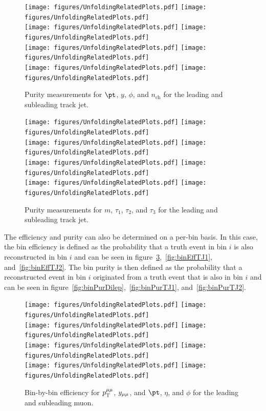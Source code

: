 \begin{figure}[h!]
  \centering
  \texttt{[image: figures/UnfoldingRelatedPlots.pdf]}
  \texttt{[image: figures/UnfoldingRelatedPlots.pdf]} \\
  \texttt{[image: figures/UnfoldingRelatedPlots.pdf]}
  \texttt{[image: figures/UnfoldingRelatedPlots.pdf]} \\
  \texttt{[image: figures/UnfoldingRelatedPlots.pdf]}
  \texttt{[image: figures/UnfoldingRelatedPlots.pdf]} \\
  \texttt{[image: figures/UnfoldingRelatedPlots.pdf]}
  \texttt{[image: figures/UnfoldingRelatedPlots.pdf]}
  \caption{Purity measurements for $\pt$, $y$, $\phi$, and $n_{\text{ch}}$ for the leading and subleading track jet.}
  \label{fig:PurTJ1}
\end{figure}

\begin{figure}[h!]
  \centering
  \texttt{[image: figures/UnfoldingRelatedPlots.pdf]}
  \texttt{[image: figures/UnfoldingRelatedPlots.pdf]} \\
  \texttt{[image: figures/UnfoldingRelatedPlots.pdf]}
  \texttt{[image: figures/UnfoldingRelatedPlots.pdf]} \\
  \texttt{[image: figures/UnfoldingRelatedPlots.pdf]}
  \texttt{[image: figures/UnfoldingRelatedPlots.pdf]} \\
  \texttt{[image: figures/UnfoldingRelatedPlots.pdf]}
  \texttt{[image: figures/UnfoldingRelatedPlots.pdf]}
  \caption{Purity measurements for $m$, $\tau_1$, $\tau_2$, and $\tau_3$ for the leading and subleading track jet.}
  \label{fig:PurTJ2}
\end{figure}

The efficiency and purity can also be determined on a per-bin basis. In this case, the bin efficiency is defined as the probability that a truth event in bin $i$ is also reconstructed in bin $i$ and can be seen in figure~\ref{fig:binEffDilep},~\ref{fig:binEffTJ1}, and~\ref{fig:binEffTJ2}. The bin purity is then defined as the probability that a reconstructed event in bin $i$ originated from a truth event that is also in bin $i$ and can be seen in figure~\ref{fig:binPurDilep},~\ref{fig:binPurTJ1}, and~\ref{fig:binPurTJ2}.

\begin{figure}[h!]
  \centering
  \texttt{[image: figures/UnfoldingRelatedPlots.pdf]}
  \texttt{[image: figures/UnfoldingRelatedPlots.pdf]} \\
  \texttt{[image: figures/UnfoldingRelatedPlots.pdf]}
  \texttt{[image: figures/UnfoldingRelatedPlots.pdf]} \\
  \texttt{[image: figures/UnfoldingRelatedPlots.pdf]}
  \texttt{[image: figures/UnfoldingRelatedPlots.pdf]} \\
  \texttt{[image: figures/UnfoldingRelatedPlots.pdf]}
  \texttt{[image: figures/UnfoldingRelatedPlots.pdf]}
  \caption{Bin-by-bin efficiency for $p_\mathrm{T}^{\mu\mu}$, $y_{\mu\mu}$, and $\pt$, $\eta$, and $\phi$ for the leading and subleading muon.}
  \label{fig:binEffDilep}
\end{figure}

